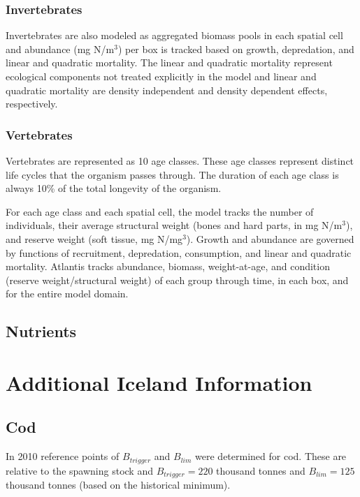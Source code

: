 \documentclass{report}
\begin{document}
\subsubsection{Invertebrates}

Invertebrates are also modeled as aggregated biomass pools in each spatial cell and abundance (mg N/m$^3$) per box is tracked based on growth, depredation, and linear and quadratic mortality. The linear and quadratic mortality represent ecological components not treated explicitly in the model and linear and quadratic mortality are density independent and density dependent effects, respectively. 

\subsubsection{Vertebrates}

Vertebrates are represented as 10 age classes. These age classes represent distinct life cycles that the organism passes through. The duration of each age class is always 10\% of the total longevity of the organism. 

For each age class and each spatial cell, the model tracks the number of individuals, their average structural weight (bones and hard parts, in mg N/m$^3$), and reserve weight (soft tissue, mg N/mg$^3$). Growth and abundance are governed by functions of recruitment, depredation, consumption, and linear and quadratic mortality. Atlantis tracks abundance, biomass, weight-at-age, and condition (reserve weight/structural weight) of each group through time, in each box, and for the entire model domain.

\subsection{Nutrients}  


\section{Additional Iceland Information}

\subsection{Cod}
In 2010 reference points of $B_{trigger}$ and $B_{lim}$ were determined for cod. These are relative to the spawning stock and $B_{trigger} = 220$ thousand tonnes and $B_{lim} = 125$ thousand tonnes (based on the historical minimum). 
\end{document}
